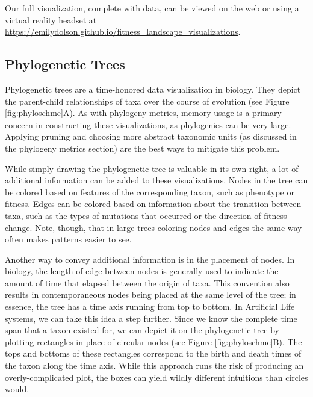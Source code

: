 \documentclass[letterpaper]{article}
\begin{document}
Our full visualization, complete with data, can be viewed on the web or using a virtual reality headset at \url{https://emilydolson.github.io/fitness_landscape_visualizations}.

\subsection{Phylogenetic Trees}

Phylogenetic trees are a time-honored data visualization in biology. They depict the parent-child relationships of taxa over the course of evolution (see Figure \ref{fig:phyloschme}A). As with phylogeny metrics, memory usage is a primary concern in constructing these visualizations, as phylogenies can be very large. Applying pruning and choosing more abstract taxonomic units (as discussed in the phylogeny metrics section) are the best ways to mitigate this problem.

While simply drawing the phylogenetic tree is valuable in its own right, a lot of additional information can be added to these visualizations. Nodes in the tree can be colored based on features of the corresponding taxon, such as phenotype or fitness. Edges can be colored based on information about the transition between taxa, such as the types of mutations that occurred or the direction of fitness change. Note, though, that in large trees coloring nodes and edges the same way often makes patterns easier to see.

Another way to convey additional information is in the placement of nodes. In biology, the length of edge between nodes is generally used to indicate the amount of time that elapsed between the origin of taxa. This convention also results in contemporaneous nodes being placed at the same level of the tree; in essence, the tree has a time axis running from top to bottom. In Artificial Life systems, we can take this idea a step further. Since we know the complete time span that a taxon existed for, we can depict it on the phylogenetic tree by plotting rectangles in place of circular nodes (see Figure \ref{fig:phyloschme}B). The tops and bottoms of these rectangles correspond to the birth and death times of the taxon along the time axis. While this approach runs the risk of producing an overly-complicated plot, the boxes can yield wildly different intuitions than circles would.
\end{document}
